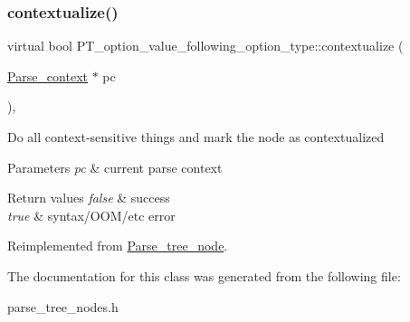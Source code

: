 \subsubsection{\texorpdfstring{contextualize()}{contextualize()}}
{\footnotesize\ttfamily virtual bool P\+T\+\_\+option\+\_\+value\+\_\+following\+\_\+option\+\_\+type\+::contextualize (\begin{DoxyParamCaption}\item[{\mbox{\hyperlink{structParse__context}{Parse\+\_\+context}} $\ast$}]{pc }\end{DoxyParamCaption})\hspace{0.3cm}{\ttfamily [inline]}, {\ttfamily [virtual]}}

Do all context-\/sensitive things and mark the node as contextualized


\begin{DoxyParams}{Parameters}
{\em pc} & current parse context\\
\hline
\end{DoxyParams}

\begin{DoxyRetVals}{Return values}
{\em false} & success \\
\hline
{\em true} & syntax/\+O\+O\+M/etc error \\
\hline
\end{DoxyRetVals}


Reimplemented from \mbox{\hyperlink{classParse__tree__node_a22d93524a537d0df652d7efa144f23da}{Parse\+\_\+tree\+\_\+node}}.



The documentation for this class was generated from the following file\+:\begin{DoxyCompactItemize}
\item 
parse\+\_\+tree\+\_\+nodes.\+h\end{DoxyCompactItemize}
